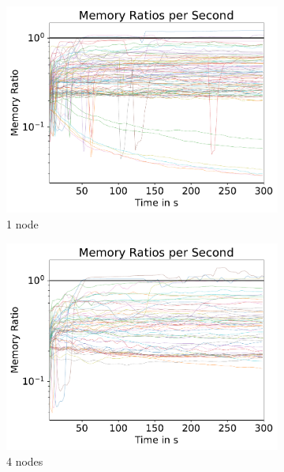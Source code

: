 \documentclass[12pt,a4paper,twoside]{scrartcl}
\numberwithin{equation}{section}
\begin{document}
\begin{figure}[!h]
  \center
  \begin{subfigure}[c]{.45\textwidth}
    \center
    \includegraphics[scale=.45]{plots/1node_compare/mem_ratio_per_second.pdf}
    \caption{1 node}
  \end{subfigure}
  \begin{subfigure}[c]{.45\textwidth}
    \center
    \includegraphics[scale=.45]{plots/4node_compare/mem_ratio_per_second.pdf}
    \caption{4 nodes}
  \end{subfigure}
  \begin{subfigure}[c]{.45\textwidth}
    \center

\end{subfigure}
\end{figure}
\end{document}
